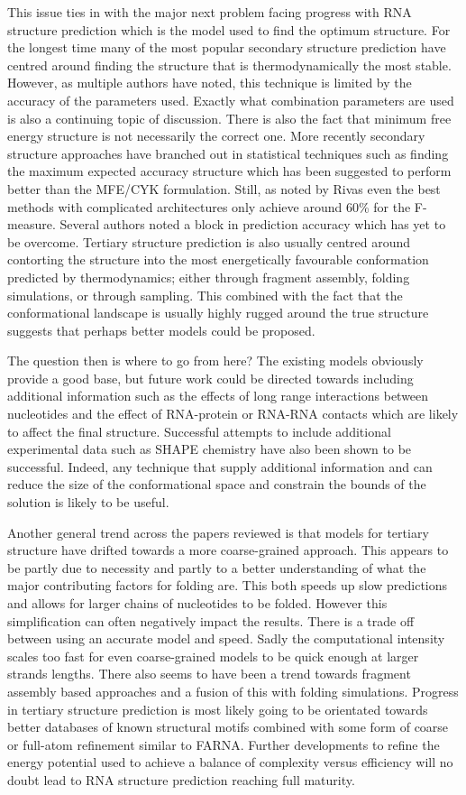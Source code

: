 \documentclass[journal]{IEEEtran}
\begin{document}
This issue ties in with the major next problem facing progress with RNA structure prediction which is the model used to find the optimum structure. For the longest time many of the most popular secondary structure prediction have centred around finding the structure that is thermodynamically the most stable. However, as multiple authors have noted, this technique is limited by the accuracy of the parameters used. Exactly what combination parameters are used is also a continuing topic of discussion. There is also the fact that minimum free energy structure is not necessarily the correct one. More recently secondary structure approaches have branched out in statistical techniques such as finding the maximum expected accuracy structure which has been suggested to perform better than the MFE/CYK formulation. Still, as noted by Rivas \cite{rivas2013four} even the best methods with complicated architectures only achieve around 60\% for the F-measure. Several authors noted a block in prediction accuracy which has yet to be overcome. Tertiary structure prediction is also usually centred around contorting the structure into the most energetically favourable conformation predicted by thermodynamics; either through fragment assembly, folding simulations, or through sampling. This combined with the fact that the conformational landscape is usually highly rugged around the true structure suggests that perhaps better models could be proposed. 

The question then is where to go from here? The existing models obviously provide a good base, but future work could be directed towards including additional information such as the effects of long range interactions between nucleotides and the effect of RNA-protein or RNA-RNA contacts which are likely to affect the final structure. Successful attempts to include additional experimental data such as SHAPE chemistry have also been shown to be successful. Indeed, any technique that supply additional information and can reduce the size of the conformational space and constrain the bounds of the solution is likely to be useful.

Another general trend across the papers reviewed is that models for tertiary structure have drifted towards a more coarse-grained approach. This appears to be partly due to necessity and partly to a better understanding of what the major contributing factors for folding are. This both speeds up slow predictions and allows for larger chains of nucleotides to be folded. However this simplification can often negatively impact the results. There is a trade off between using an accurate model and speed. Sadly the computational intensity scales too fast for even coarse-grained models to be quick enough at larger strands lengths. There also seems to have been a trend towards fragment assembly based approaches and a fusion of this with folding simulations. Progress in tertiary structure prediction is most likely going to be orientated towards better databases of known structural motifs combined with some form of coarse or full-atom refinement similar to FARNA. Further developments to refine  the energy potential used to achieve a balance of complexity versus efficiency will no doubt lead to RNA structure prediction reaching full maturity.
\end{document}
